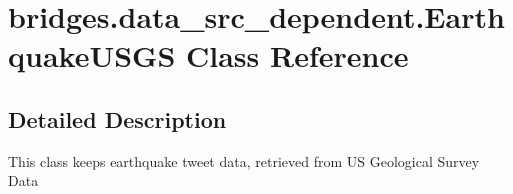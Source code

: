 \hypertarget{classbridges_1_1data__src__dependent_1_1_earthquake_u_s_g_s}{}\section{bridges.\+data\+\_\+src\+\_\+dependent.\+Earthquake\+U\+S\+GS Class Reference}
\label{classbridges_1_1data__src__dependent_1_1_earthquake_u_s_g_s}


\subsection{Detailed Description}
This class keeps earthquake tweet data, retrieved from US Geological Survey Data

